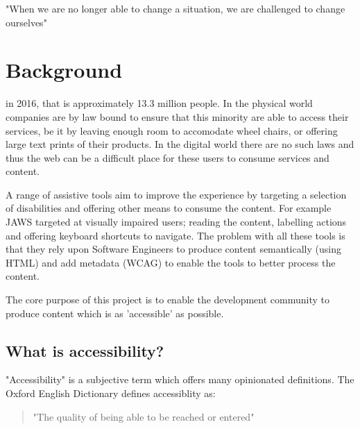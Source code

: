 \begin{savequote}[75mm]
"When we are no longer able to change a situation, we are challenged to
change ourselves"
\end{savequote}

\chapter{Background}
 in
2016, that is
approximately 13.3 million people. In the physical world companies are by law
bound to ensure that this minority are able to access their services, be it by
leaving enough room to accomodate wheel chairs, or offering large text prints
of their products. In the digital world there are no such laws and thus the web can be a
difficult place for these users to consume services and content.

A range of assistive
tools aim to improve the experience by targeting a selection of
disabilities and offering other means to consume the content. For example
JAWS targeted at visually impaired users; reading the content,
labelling actions and offering keyboard shortcuts to navigate. The
problem
with all these tools is that they rely upon Software Engineers to produce
content semantically (using HTML) and add metadata (WCAG) to enable the tools
to better process the content.

The core purpose of this project is to enable the development community to
produce content which is as 'accessible' as possible.

\section{What is accessibility?}
"Accessibility" is a subjective term which offers many opinionated
definitions. The Oxford English Dictionary defines accessiblity as:
\begin{quote}
"The quality of being able to be reached or entered"
\end{quote}


